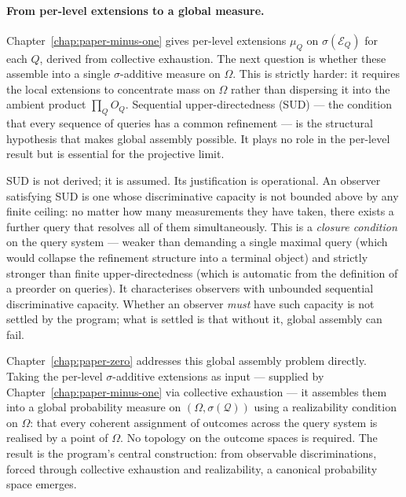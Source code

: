 \paragraph{From per-level extensions to a global measure.}
Chapter~\ref{chap:paper-minus-one} gives per-level extensions $\mu_Q$ on
$\sigma(\mathcal{E}_Q)$ for each $Q$, derived from collective exhaustion.  The next
question is whether these assemble into a single $\sigma$-additive measure on
$\Omega$.  This is strictly harder: it requires the local extensions to concentrate
mass on $\Omega$ rather than dispersing it into the ambient product $\prod_Q O_Q$.
Sequential upper-directedness (SUD) --- the condition that every sequence of queries
has a common refinement --- is the structural hypothesis that makes global assembly
possible.  It plays no role in the per-level result but is essential for the
projective limit.

SUD is not derived; it is assumed.  Its justification is operational.  An observer
satisfying SUD is one whose discriminative capacity is not bounded above by any
finite ceiling: no matter how many measurements they have taken, there exists a
further query that resolves all of them simultaneously.  This is a
\emph{closure condition} on the query system --- weaker than demanding a single
maximal query (which would collapse the refinement structure into a terminal object)
and strictly stronger than finite upper-directedness (which is automatic from the
definition of a preorder on queries).  It characterises observers with unbounded
sequential discriminative capacity.  Whether an observer \emph{must} have such
capacity is not settled by the program; what is settled is that without it, global
assembly can fail.

Chapter~\ref{chap:paper-zero} addresses this global assembly problem directly.
Taking the per-level $\sigma$-additive extensions as input --- supplied by
Chapter~\ref{chap:paper-minus-one} via collective exhaustion --- it assembles them
into a global probability measure on $(\Omega, \sigma(\mathcal{Q}))$ using a
realizability condition on $\Omega$: that every coherent assignment of outcomes
across the query system is realised by a point of $\Omega$.  No topology on the
outcome spaces is required.  The result is the program's central construction: from
observable discriminations, forced through collective exhaustion and realizability,
a canonical probability space emerges.

